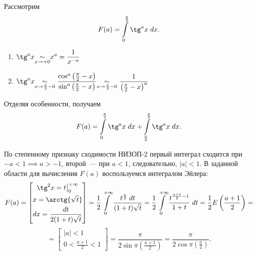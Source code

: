 \documentclass[../../main.tex]{subfiles}
\begin{document}
\begin{example}
	Рассмотрим
	\[  F(a) = \int\limits_{0}^{\frac{\pi}{2}} \tg^a x \; dx. \]
	
	\begin{enumerate}
	 \item $\displaystyle \tg^a x  {\underset{x \to +0}\sim} x^a = 
	 \frac{1}{x^{-a}}$
	 
	 \item $\displaystyle \tg^a x {\underset{x \to \frac{\pi}{2} - 0}\sim\ } 
	 \frac{\cos^a \left( \frac{\pi}{2} - x\right) }{\sin^a \left( \frac{\pi}{2} - 
	 x\right)} {\underset{x \to \frac{\pi}{2} - 0}\sim\ } \frac{1}{\left( 
	 \frac{\pi}{2} - x\right)^a }$
	\end{enumerate}
	
	Отделяя особенности, получаем
	\[  F(a) = \int\limits_{0}^{\frac{\pi}{4}} \tg^a x \; dx + 
	\int\limits_{\frac{\pi}{4}}^{\frac{\pi}{2}} \tg^a x \; dx. \]
	
	По степенному признаку сходимости НИЗОП-2 первый интеграл сходится при ${-a < 
	1} \implies {a > -1}$, второй~--- при $a < 1$, следовательно, $|a| < 1$. В 
	заданной области для вычисления $F(a)$ воспользуемся интегралом Эйлера:
	\[  F(a) = \left[ \begin{gathered}   
	\tg^2 x  = t \big|_{0}^{+\infty}\\
	x = \arctg{\sqrt{t}} \\
	dx = \frac{dt}{2(1+t)\sqrt{t}}
	\end{gathered}\right] = \frac{1}{2} \int\limits_{0}^{+\infty} \frac{ 
	t^{\frac{a}{2}}  \; dt}{(1+t)\sqrt{t}} = \frac{1}{2} 
	\int\limits_{0}^{+\infty} \frac{t^{\frac{a+1}{2} - 1} }{1+t} \; dt = 
	\frac{1}{2}E\left( \frac{a+1}{2} \right) =   \]
	\[ = \left[ \begin{gathered}   
	|a|<1\\
	0 < \frac{a+1}{2} < 1
	\end{gathered}\right] = \frac{\pi}{2\sin{\pi\left( \frac{a+1}{2}\right) }} =  
	\frac{\pi}{2\cos{\pi\left( \frac{a}{2}\right) }}. \]
\end{example}	
\end{document}
